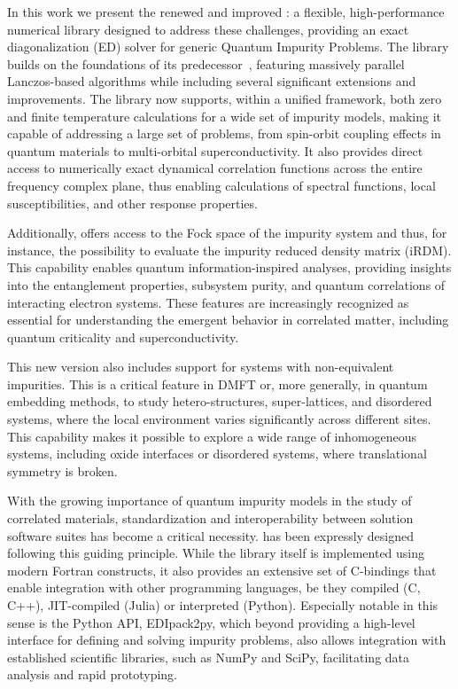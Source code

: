 \documentclass[edipack_sp.tex]{subfiles}
\begin{document}
In this work we present the renewed and improved \NAME{}: a flexible, high-performance numerical library designed to address these challenges, providing an exact diagonalization (ED) solver for generic Quantum Impurity Problems. 
The library builds on the foundations of
its predecessor~\cite{Amaricci2022}, featuring massively parallel Lanczos-based algorithms while including several significant extensions and improvements. The library now supports, within a unified framework, both zero and finite temperature calculations for a wide set of impurity models, making it capable of addressing a large set of problems, from spin-orbit coupling effects in quantum materials to multi-orbital superconductivity. It also provides direct
access to numerically exact
dynamical correlation functions across the
entire frequency complex plane, thus enabling calculations of spectral functions, local susceptibilities, and other response properties.

Additionally, \NAME offers access to the Fock space of
the impurity system and thus, for instance, the possibility to evaluate the impurity reduced density matrix
(iRDM). This capability enables quantum information-inspired analyses, providing insights into the entanglement properties, subsystem purity, and quantum correlations of interacting electron systems. These
features are increasingly recognized as essential for understanding the emergent behavior in correlated matter, including quantum criticality and superconductivity.

This new version also includes support for systems with non-equivalent impurities. This is a critical feature in DMFT or, more generally, in quantum embedding methods, to study hetero-structures, super-lattices, and disordered systems, where the local environment varies significantly across different sites. This capability makes it 
possible to explore a wide range of inhomogeneous systems, including
oxide interfaces or disordered systems, where
translational symmetry is broken.

With the growing importance of  quantum impurity models in the study of correlated materials,
standardization and interoperability between solution software suites has
become a critical necessity.
\NAME has been expressly designed following this guiding principle. 
While the library itself is implemented using modern Fortran constructs, it also provides an extensive set of C-bindings that enable integration with other programming languages,
be they compiled (C, C++), JIT-compiled (Julia) or interpreted (Python). 
Especially notable in this sense is the Python API, EDIpack2py, which beyond providing a 
high-level interface for defining and solving impurity problems, also allows integration with established scientific libraries, such as NumPy and SciPy, facilitating data analysis and
rapid prototyping.
\end{document}
